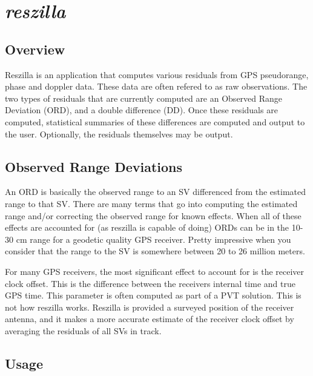 %
%

\section{\emph{reszilla}}
\subsection{Overview}
Reszilla is an application that computes various residuals from GPS
pseudorange, phase and doppler data. These data are often refered to
as raw observations. The two types of residuals that are currently
computed are an Observed Range Deviation (ORD), and a double
difference (DD). Once these residuals are computed, statistical
summaries of these differences are computed and output to the
user. Optionally, the residuals themselves may be output.

\subsection{Observed Range Deviations}
An ORD is basically the observed range to an SV differenced from the
estimated range to that SV. There are many terms that go into
computing the estimated range and/or correcting the observed range for
known effects. When all of these effects are accounted for (as
reszilla is capable of doing) ORDs can be in the 10-30 cm range for a
geodetic quality GPS receiver. Pretty impressive when you consider
that the range to the SV is somewhere between 20 to 26 million meters.

For many GPS receivers, the most significant effect to account for is the receiver
clock offset. This is the difference between the receivers internal time and true
GPS time. This parameter is often computed as part of a PVT solution. This is not
how reszilla works. Reszilla is provided a surveyed position of the receiver
antenna, and it makes a more accurate estimate of the receiver clock offset by
averaging the residuals of all SVs in track.

\subsection{Usage}


